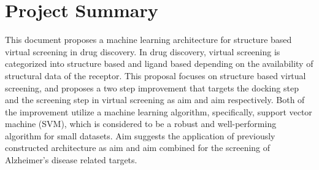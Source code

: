 \section{Project Summary}

This document proposes a machine learning architecture for structure based virtual screening in drug discovery. 
In drug discovery, virtual screening is categorized into structure based and ligand based depending on the availability of structural data of the receptor.
This proposal focuses on structure based virtual screening,
and proposes a two step improvement that targets the docking step and the screening step in virtual screening 
as aim  and aim  respectively. 
Both of the improvement utilize a machine learning algorithm, specifically, support vector machine (SVM), 
which is considered to be a robust and well-performing algorithm 
for small datasets.
Aim  suggests the application of previously constructed architecture as aim  and aim  combined for the screening of Alzheimer's disease related targets. 


